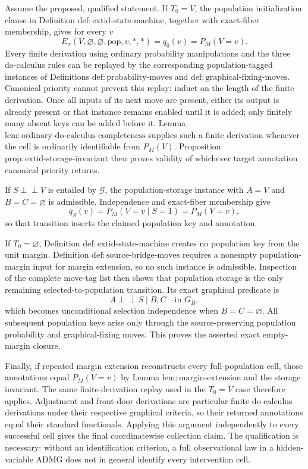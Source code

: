 Assume the proposed, qualified statement.  If \(T_0=V\), the population initialization clause in Definition \(\mathrm{def{:}extid\text{-}state\text{-}machine}\), together with exact-fiber membership, gives for every \(v\)
\[
 E_\sigma(V,\varnothing,\varnothing,\mathrm{pop},v,\ast,\ast)
 =q_0(v)=P_M(V=v).
\]
Every finite derivation using ordinary probability manipulations and the three do-calculus rules can be replayed by the corresponding population-tagged instances of Definitions \(\mathrm{def{:}probability\text{-}moves}\) and \(\mathrm{def{:}graphical\text{-}fixing\text{-}moves}\).  Canonical priority cannot prevent this replay: induct on the length of the finite derivation.  Once all inputs of its next move are present, either its output is already present or that instance remains enabled until it is added; only finitely many absent keys can be added before it.  Lemma \(\mathrm{lem{:}ordinary\text{-}do\text{-}calculus\text{-}completeness}\) supplies such a finite derivation whenever the cell is ordinarily identifiable from \(P_M(V)\).  Proposition \(\mathrm{prop{:}extid\text{-}storage\text{-}invariant}\) then proves validity of whichever target annotation canonical priority returns.

If \(S\perp\!\!\!\perp V\) is entailed by \(\mathcal G\), the population-storage instance with \(A=V\) and \(B=C=\varnothing\) is admissible.  Independence and exact-fiber membership give
\[
 q_S(v)=P_M(V=v\mid S=1)=P_M(V=v),
\]
so that transition inserts the claimed population key and annotation.

If \(T_0=\varnothing\), Definition \(\mathrm{def{:}extid\text{-}state\text{-}machine}\) creates no population key from the unit margin.  Definition \(\mathrm{def{:}source\text{-}bridge\text{-}moves}\) requires a nonempty population-margin input for margin extension, so no such instance is admissible.  Inspection of the complete move-tag list then shows that population storage is the only remaining selected-to-population transition.  Its exact graphical predicate is
\[
 A\perp\!\!\!\perp S\mid B,C
 \quad\text{in }G_{\overline B},
\]
which becomes unconditional selection independence when \(B=C=\varnothing\).  All subsequent population keys arise only through the source-preserving population probability and graphical-fixing moves.  This proves the asserted exact empty-margin closure.

Finally, if repeated margin extension reconstructs every full-population cell, those annotations equal \(P_M(V=v)\) by Lemma \(\mathrm{lem{:}margin\text{-}extension}\) and the storage invariant.  The same finite-derivation replay used in the \(T_0=V\) case therefore applies.  Adjustment and front-door derivations are particular finite do-calculus derivations under their respective graphical criteria, so their returned annotations equal their standard functionals.  Applying this argument independently to every successful cell gives the final coordinatewise collection claim.  The qualification is necessary: without an identification criterion, a full observational law in a hidden-variable ADMG does not in general identify every intervention cell.